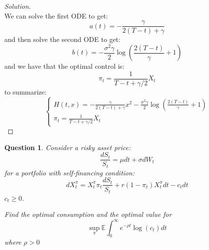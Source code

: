 \documentclass{amsart}
\newtheorem{theorem}{Question}
\begin{document}
\begin{proof}[Solution]
\[   \]
   We can solve the first ODE to get: 
   \[
   a(t) = - \frac{\gamma}{2(T - t) + \gamma}
   \]
   and then solve the second ODE to get: 
   \[
   b(t) = -\frac{\sigma^2 \gamma}{2} \log{\left(
    \frac{2(T - t)}{\gamma} + 1
   \right)}
   \]
   and we have that the optimal control is: 
   \[
   \pi_t = \frac{1}{T - t + \gamma / 2} X_t
   \]
   to summarize: 
   \[
   \begin{cases}
    H(t, x) = - \frac{\gamma}{2(T - t) + \gamma} x^2 -\frac{\sigma^2 \gamma}{2} \log{\left(
    \frac{2(T - t)}{\gamma} + 1
   \right)}\\
   \pi_t = \frac{1}{T - t + \gamma / 2} X_t
   \end{cases}
   \]
\end{proof}
\begin{theorem}
    Consider a risky asset price:
    \[
    \frac{d S_t}{S_t} = \mu dt + \sigma dW_t
    \]
    for a portfolio with self-financing condition:
    \[
    d X_t^\pi = X_t^\pi \pi_t \frac{d S_t}{S_t} + r(1 - \pi_t) X_t^\pi dt - c_t dt
    \]
    $c_t \ge 0$. 

    Find the optimal consumption and the optimal value for 
    \[
    \sup_\pi \mathbb{E} \int_0^\infty e^{-\rho t} \log{(c_t)} dt
    \]
    where $\rho > 0$
\end{theorem}
\end{document}
